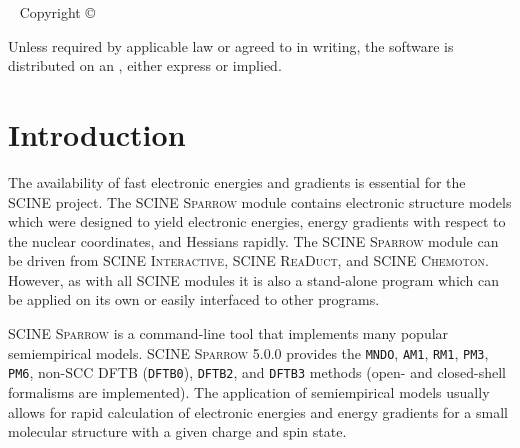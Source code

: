 \documentclass[]{tufte-book}
\title[SCINE Sparrow manual]{User Manual \vskip 0.5em {\setlength{\parindent}{0pt} \Huge SCINE Sparrow 5.0.0}}
\author[The SCINE Sparrow Developers]{The SCINE Sparrow Developers: \newline \noindent Francesco Bosia, Tamara Husch, Charlotte H.~M\"uller, Severin Polonius, Jan-Grimo Sobez, Miguel Steiner, Jan P.~Unsleber, Alain C.~Vaucher, Thomas Weymuth, and Markus Reiher}
\newcommand{\monthyear}{%
  \ifcase\month\or January\or February\or March\or April\or May\or June\or
  July\or August\or September\or October\or November\or
  December\fi\space\number\year
}
\begin{document}
\setlength{\parindent}{0pt}

\frontmatter


\maketitle


\newpage
\begin{fullwidth}
~\vfill
\thispagestyle{empty}
\setlength{\parindent}{0pt}
\setlength{\parskip}{\baselineskip}
Copyright \copyright\ \the\year\ \thanklessauthor


\par{}

\par Unless required by applicable law or agreed to in writing, the software 
is distributed on an , either express or implied. 

\end{fullwidth}

\tableofcontents




\mainmatter

\let\cleardoublepage\clearpage
\chapter{Introduction}

The availability of fast electronic energies and gradients is essential for the SCINE project. The SCINE \textsc{Sparrow} 
module contains electronic structure models which were designed to yield electronic energies, energy gradients with 
respect to the nuclear coordinates, and Hessians rapidly. The SCINE \textsc{Sparrow} module can be driven from SCINE 
\textsc{Interactive}, SCINE \textsc{ReaDuct}, and SCINE \textsc{Chemoton}. However, as with all SCINE modules it is also 
a stand-alone program which can be applied on its own or easily interfaced to other programs.

SCINE \textsc{Sparrow} is a command-line tool that implements many popular semiempirical models. SCINE \textsc{Sparrow} 5.0.0
provides the \texttt{MNDO}, \texttt{AM1}, \texttt{RM1}, \texttt{PM3}, \texttt{PM6}, non-SCC DFTB (\texttt{DFTB0}), \texttt{DFTB2}, and \texttt{DFTB3} methods 
(open- and closed-shell formalisms are implemented). 
The application of semiempirical models usually allows for rapid calculation of electronic energies and energy gradients 
for a small molecular structure with a given charge and spin state.
\end{document}
